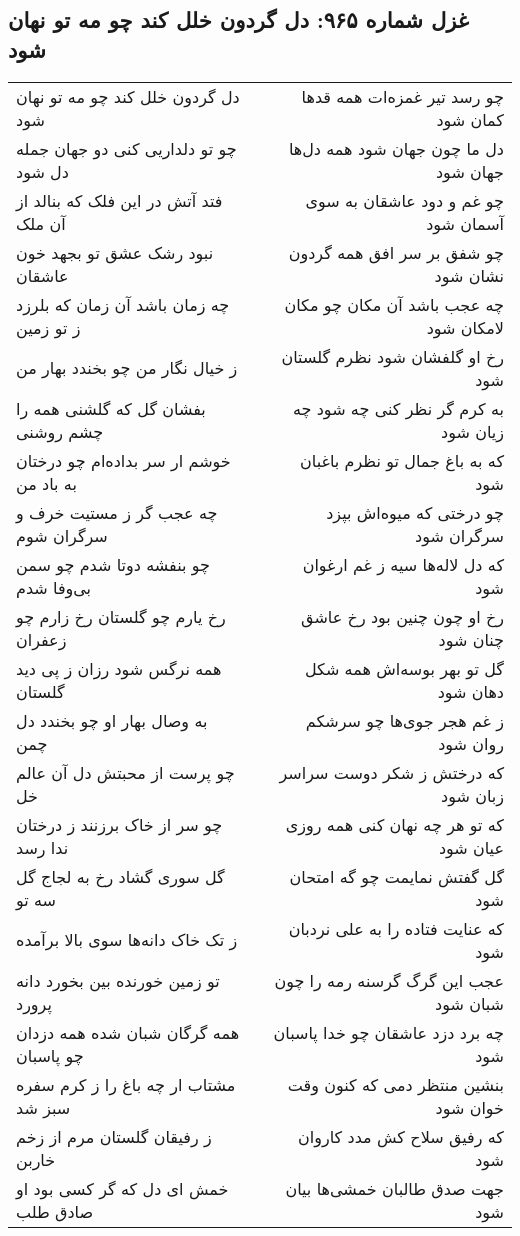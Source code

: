 \begin{center}
\section*{غزل شماره ۹۶۵: دل گردون خلل کند چو مه تو نهان شود}
\label{sec:0965}
\begin{longtable}{l p{0.5cm} r}
دل گردون خلل کند چو مه تو نهان شود
&&
چو رسد تیر غمزه‌ات همه قدها کمان شود
\\
چو تو دلداریی کنی دو جهان جمله دل شود
&&
دل ما چون جهان شود همه دل‌ها جهان شود
\\
فتد آتش در این فلک که بنالد از آن ملک
&&
چو غم و دود عاشقان به سوی آسمان شود
\\
نبود رشک عشق تو بجهد خون عاشقان
&&
چو شفق بر سر افق همه گردون نشان شود
\\
چه زمان باشد آن زمان که بلرزد ز تو زمین
&&
چه عجب باشد آن مکان چو مکان لامکان شود
\\
ز خیال نگار من چو بخندد بهار من
&&
رخ او گلفشان شود نظرم گلستان شود
\\
بفشان گل که گلشنی همه را چشم روشنی
&&
به کرم گر نظر کنی چه شود چه زیان شود
\\
خوشم ار سر بداده‌ام چو درختان به باد من
&&
که به باغ جمال تو نظرم باغبان شود
\\
چه عجب گر ز مستیت خرف و سرگران شوم
&&
چو درختی که میوه‌اش بپزد سرگران شود
\\
چو بنفشه دوتا شدم چو سمن بی‌وفا شدم
&&
که دل لاله‌ها سیه ز غم ارغوان شود
\\
رخ یارم چو گلستان رخ زارم چو زعفران
&&
رخ او چون چنین بود رخ عاشق چنان شود
\\
همه نرگس شود رزان ز پی دید گلستان
&&
گل تو بهر بوسه‌اش همه شکل دهان شود
\\
به وصال بهار او چو بخندد دل چمن
&&
ز غم هجر جوی‌ها چو سرشکم روان شود
\\
چو پرست از محبتش دل آن عالم خل
&&
که درختش ز شکر دوست سراسر زبان شود
\\
چو سر از خاک برزنند ز درختان ندا رسد
&&
که تو هر چه نهان کنی همه روزی عیان شود
\\
گل سوری گشاد رخ به لجاج گل سه تو
&&
گل گفتش نمایمت چو گه امتحان شود
\\
ز تک خاک دانه‌ها سوی بالا برآمده
&&
که عنایت فتاده را به علی نردبان شود
\\
تو زمین خورنده بین بخورد دانه پرورد
&&
عجب این گرگ گرسنه رمه را چون شبان شود
\\
همه گرگان شبان شده همه دزدان چو پاسبان
&&
چه برد دزد عاشقان چو خدا پاسبان شود
\\
مشتاب ار چه باغ را ز کرم سفره سبز شد
&&
بنشین منتظر دمی که کنون وقت خوان شود
\\
ز رفیقان گلستان مرم از زخم خاربن
&&
که رفیق سلاح کش مدد کاروان شود
\\
خمش ای دل که گر کسی بود او صادق طلب
&&
جهت صدق طالبان خمشی‌ها بیان شود
\\
\end{longtable}
\end{center}
